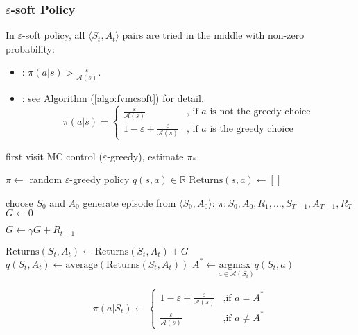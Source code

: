 \subsubsection{$\varepsilon$-soft Policy}

In $\varepsilon$-soft policy, all $\langle S_t, A_t \rangle$ pairs are tried in the middle with non-zero probability:

\begin{itemize}
	\item {} : $\pi(a|s) >\displaystyle \frac{\varepsilon}{\mathcal{A}(s)}$.
	\item {} : see Algorithm (\ref{algo:fvmcsoft}) for detail.
\begin{equation*}
	\pi(a|s) = 	
		\begin{cases}
				\displaystyle \frac{\varepsilon}{\mathcal{A}(s)} & \text{, if } a \text{ is not the greedy choice} \\
				1 - \varepsilon + \displaystyle \frac{\varepsilon}{\mathcal{A}(s)} & \text{, if } a  \text{ is the greedy choice}
		\end{cases}
\end{equation*}
\end{itemize}



\begin{algorithm}
	\caption{first visit MC control ($\varepsilon$-greedy), estimate $\pi_*$}\label{algo:fvmcsoft}	
	
	\begin{algorithmic}[1]
		\State $\pi \gets $ random $\varepsilon$-greedy policy
		\State $q(s,a) \in \mathbb{R}$
		\State $\text{Returns}(s,a) \gets []$
		
		\Statex
		
		\Loop
			\State choose $S_0$ and $A_0$ 
			\State generate episode from $\langle S_0,A_0 \rangle$: $\pi: S_0, A_0, R_1, \dots, S_{T-1}, A_{T-1}, R_T$
			\State $G \gets 0$
			
				\State $G \gets \gamma G + R_{t+1}$
				
					\State $\text{Returns}(S_t, A_t) \gets \text{Returns}(S_t, A_t) + G$
					\State $q(S_t, A_t) \gets \text{average}(\text{Returns}(S_t, A_t))$
					\State $A^* \gets \underset{a \in \mathcal{A}(S_t)}{\text{argmax }} q(S_t, a) $
					
					   
						\State \begin{equation*}
							\pi(a|S_t) \gets \begin{cases}
								\displaystyle 1 - \varepsilon + \frac{\varepsilon}{\mathcal{A}(s)} & \text{,if } a = A^* \\
								\displaystyle \frac{\varepsilon}{\mathcal{A}(s)} & \text{,if } a \neq A^*
							\end{cases} 
						\end{equation*}
					\EndFor
				\EndIf
			\EndFor
		\EndLoop
	\end{algorithmic}
\end{algorithm}

